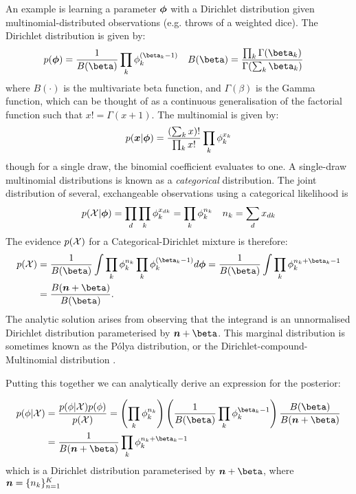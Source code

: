An example is learning a parameter ${ \bm \phi }$ with a Dirichlet distribution given multinomial-distributed observations (e.g. throws of a weighted dice). The Dirichlet distribution is given by:
\begin{align}
p(\param) & = \oneover{B(\vv{\beta})} \prod_k \phi_k^{(\beta_k - 1)} &
B(\vv{\beta}) & = \frac{\prod_k \Gamma(\beta_k)}{\Gamma(\sum_k \beta_k)}
\end{align}
where $B(\cdot)$ is the multivariate beta function, and $\Gamma(\beta)$ is the Gamma function, which can be thought of as a continuous generalisation of the factorial function such that $x! = \Gamma(x+1)$. The multinomial is given by:
\begin{align}
p(\bm x|{ \bm \phi }) = \frac{(\sum_k x)!}{\prod_k x!} \prod_k \phi_k^{x_k}
\end{align}
though for a single draw, the binomial coefficient evaluates to one. A single-draw multinomial distributions is known as a \emph{categorical} distribution. The joint distribution of several, exchangeable observations using a categorical likelihood is 
\begin{align}
p({ \mathcal{X} }|{ \bm \phi }) & = \prod_d \prod_k \phi_k^{x_{dk}} = \prod_k \phi_k^{n_k} &
n_k = \sum_d x_{dk}
\end{align}
The evidence $p({ \mathcal{X} })$ for a Categorical-Dirichlet mixture is therefore:
\begin{align}
p(\xdat) & = \frac{1}{B(\beta)} \int \prod_k \phi_k^{n_k} \prod_k \phi_k^{(\beta_k - 1)} d\param  = \frac{1}{B(\beta)} \int \prod_k \phi_k^{n_k + \beta_k - 1} \\
& = \frac{B(\vv{n} + \vv{\beta})}{B(\vv{\beta})}.
\end{align}
The analytic solution arises from observing that the integrand is an unnormalised Dirichlet distribution parameterised by $\vv{n} + \vv{\beta}$. This marginal distribution is sometimes known as the P\'{o}lya distribution, or the Dirichlet-compound-Multinomial distribution \cite{Madsen2005}.\label{polya}

Putting this together we can analytically derive an expression for the posterior:

\begin{align}
\begin{split}
p(\phi|\xdat) 
& = \frac{p(\phi|\xdat)p(\phi)}{p(\xdat)}
 = \left(\prod_k \phi_k^{n_k} \right)
   \left(\oneover{B(\vv{\beta})} \prod_k \phi_k^{\beta_k - 1} \right)
   \frac{B(\vv{\beta})}{B(\vv{n} + \vv{\beta})} \\
& = \oneover{B(\vv{n} + \vv{\beta})} \prod_k \phi_k^{n_k + \beta_k - 1}
\end{split}
\end{align}
which is a Dirichlet distribution parameterised by $\vv{n} + \vv{\beta}$, where $\bm n = \{ n_k \}_{n=1}^K$

